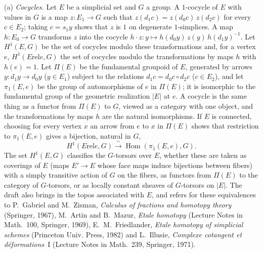 \par\smallskip\noindent(a) \emph{Cocycles.} Let \(E\) be a simplicial set
and \(G\) a group. A \(1\)-cocycle of \(E\) with values in \(G\) is a map
\(z:E_1\to G\) such that \(z(d_1c)=z(d_0c)\,z(d_2c)\) for every
\(c\in E_2\); taking \(c=s_1y\) shows that \(z\) is \(1\) on degenerate
\(1\)-simplices. A map \(h:E_0\to G\) transforms \(z\) into the cocycle
\(h\cdot z:y\mapsto h(d_0y)\,z(y)\,h(d_1y)^{-1}\). Let \(H^1(E,G)\) be the
set of cocycles modulo these transformations and, for a vertex \(e\),
\(H^1(E\mathbin{\mathrm{rel}}e,G)\) the set of cocycles modulo the
transformations by maps \(h\) with \(h(e)=1\). Let \(\Pi(E)\) be the
fundamental groupoid of \(E\), generated by arrows \(y:d_1y\to d_0y\)
(\(y\in E_1\)) subject to the relations \(d_1c=d_0c\circ d_2c\)
(\(c\in E_2\)), and let \(\pi_1(E,e)\) be the group of automorphisms of
\(e\) in \(\Pi(E)\); it is isomorphic to the fundamental group of the
geometric realization \(|E|\) at \(e\). A cocycle is the same thing as a
functor from \(\Pi(E)\) to \(G\), viewed as a category with one object,
and the transformations by maps \(h\) are the natural isomorphisms. If
\(E\) is connected, choosing for every vertex \(x\) an arrow from \(e\) to
\(x\) in \(\Pi(E)\) shows that restriction to \(\pi_1(E,e)\) gives a
bijection, natural in \(G\),
\[
  H^1(E\mathbin{\mathrm{rel}}e,G)\xrightarrow{\ \sim\ }
  \operatorname{Hom}(\pi_1(E,e),G).
\]
The set \(H^1(E,G)\) classifies the \(G\)-torsors over \(E\), whether these
are taken as coverings of \(E\) (maps \(E'\to E\) whose face maps induce
bijections between fibers) with a simply transitive action of \(G\) on the
fibers, as functors from \(\Pi(E)\) to the category of \(G\)-torsors, or as
locally constant sheaves of \(G\)-torsors on \(|E|\). The draft also brings
in the topos associated with \(E\), and refers for these equivalences to
P.~Gabriel and M.~Zisman, \emph{Calculus of fractions and homotopy theory}
(Springer, 1967), M.~Artin and B.~Mazur, \emph{Etale homotopy} (Lecture
Notes in Math.~100, Springer, 1969), E.~M.~Friedlander, \emph{Etale
homotopy of simplicial schemes} (Princeton Univ. Press, 1982) and
L.~Illusie, \emph{Complexe cotangent et déformations}~I (Lecture Notes in
Math.~239, Springer, 1971).

